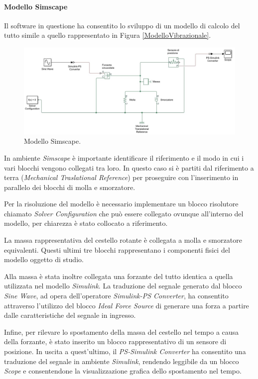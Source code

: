 \paragraph{Modello Simscape} Il software in questione ha consentito lo sviluppo di un modello di calcolo del tutto simile a quello rappresentato in Figura \ref{ModelloVibrazionale}. 
\begin{figure}[ht]
    \centering
    \includegraphics[width=\textwidth]{Immagini/ModelloSimscape.JPG}
    \caption{Modello Simscape.}
    \label{ModelloSimscape}
\end{figure}

In ambiente \textit{Simscape} è importante identificare il riferimento e il modo in cui i vari blocchi vengono collegati tra loro. In questo caso si è partiti dal riferimento a terra (\textit{Mechanical Traslational Reference}) per proseguire con l'inserimento in parallelo dei blocchi di molla e smorzatore. 

Per la risoluzione del modello è necessario implementare un blocco risolutore chiamato \textit{Solver Configuration} che può essere collegato ovunque all'interno del modello, per chiarezza è stato collocato a riferimento. 

La massa rappresentativa del cestello rotante è collegata a molla e smorzatore equivalenti. Questi ultimi tre blocchi rappresentano i componenti fisici del modello oggetto di studio. 

Alla massa è stata inoltre collegata una forzante del tutto identica a quella utilizzata nel modello \textit{Simulink}. La traduzione del segnale generato dal blocco \textit{Sine Wave}, ad opera dell'operatore \textit{Simulink-PS Converter}, ha consentito attraverso l'utilizzo del blocco \textit{Ideal Force Source} di generare una forza a partire dalle caratteristiche del segnale in ingresso. 

Infine, per rilevare lo spostamento della massa del cestello nel tempo a causa della forzante, è stato inserito un blocco rappresentativo di un sensore di posizione. In uscita a quest'ultimo, il \textit{PS-Simulink Converter} ha consentito una traduzione del segnale in ambiente \textit{Simulink}, rendendo leggibile da un blocco \textit{Scope} e consentendone la visualizzazione grafica dello spostamento nel tempo. 

